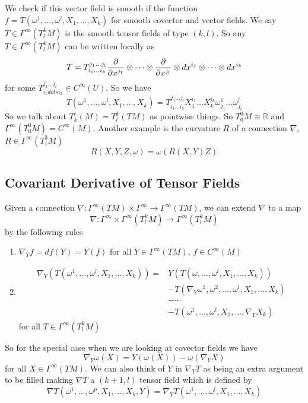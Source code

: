 \documentclass[a4paper]{article}
\begin{document}
We check if this vector field is smooth if the function $f = T(\omega^1, \dots, \omega^l, X_1, \dots, X_k)$ for smooth covector and vector fields. We say $T \in \Gamma^{\infty}(T_l^kM)$ is the smooth tensor fields of type $(k,l)$. So any $T \in \Gamma^{\infty}(T_l^kM)$ can be written locally as
\[
  T = T_{i_1 \dots i_k}^{j_1 \dots j_l} \pdv{x^{j_1} } \otimes \dots \otimes \pdv{x^{j_l}} \otimes dx^{i_1} \otimes \dots \otimes dx^{i_k} 
\]
for some $T_{i_1 dots i_k}^{j_1 \dots j_l} \in C^{\infty}(U)$. So we have
\[
  T(\omega^1, \dots, \omega^l, X_{1}, \dots, X_k) = T_{i_1 \dots i_k}^{j_1 \dots j_l} X_1^{i_1} \dots X_k^{i_k} \omega_{j_1}^1 \dots \omega_{j_l}^l
\]
So we talk about $T_k^l(M) = T_l^k(TM)$ as pointwise things. So $T_0^0 M \cong \mathds{R}$ and $\Gamma^{\infty}(T_0^0M) = C^{\infty}(M)$. Another example is the curvature $R$ of a connection $\nabla$, $R \in \Gamma^{\infty}(T_1^3M)$
\[
  R(X,Y,Z,\omega) = \omega(R(X,Y)Z)
\]

\subsection*{Covariant Derivative of Tensor Fields}%
Given a connection $\nabla: \Gamma^{\infty}(TM) \times \Gamma^{\infty} \rightarrow \Gamma^{\infty}(TM)$, we can extend $\nabla$ to a map
\[
  \nabla: \Gamma^{\infty} \times \Gamma^\infty(T_l^k M) \rightarrow \Gamma^\infty (T_l^k M)
\]
by the following rules
\begin{enumerate}
  \item $\nabla_Y f = df(Y) = Y(f)$ for all $Y \in \Gamma^\infty (TM)$, $f \in C^\infty(M)$
  \item 
    \[
      \begin{aligned}
        \nabla_Y(T(\omega^1, \dots, \omega^l, X_1, \dots, X_k)) =&  Y(T(\omega, \dots, \omega^l, X_1, \dots, X_k)) \\
      &- T(\nabla_Y \omega^1, \omega^2, \dots, \omega^l, X_1, \dots, X_k) \\ 
      &- \cdots \\
      &- T(\omega^1, \dots, \omega^l, X_1, \dots, \nabla_Y X_k)
      \end{aligned}
  \]
  for all $T \in \Gamma^\infty(T_l^k M)$
\end{enumerate}
So for the special case when we are looking at covector fields we have
\[
  \nabla_Y \omega(X) = Y(\omega(X)) - \omega(\nabla_Y X)
\]
for all $X \in \Gamma^\infty(TM)$. We can also think of $Y$ in $\nabla_Y T$ as being an extra argument to be filled making $\nabla T$ a $(k+1, l)$ tensor field which is defined by
\[
  \nabla T(\omega^1, \dots, \omega^p, X_1, \dots, X_k, Y) = \nabla_Y T(\omega^1, \dots, \omega^l, X_1, \dots, X_k)
\]
\end{document}
